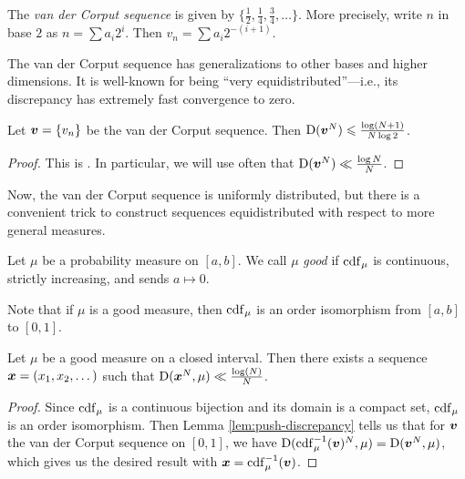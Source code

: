 \begin{definition}
The \emph{van der Corput sequence} is given by 
$\{\frac 1 2,\frac 1 4,\frac 3 4,\dots\}$. More precisely, write $n$ in base 
$2$ as $n = \sum a_i 2^i$. Then $v_n = \sum a_i 2^{-(i+1)}$. 
\end{definition}

The van der Corput sequence has generalizations to other bases and higher 
dimensions. It is well-known for being ``very equidistributed''---i.e., its 
discrepancy has extremely fast convergence to zero. 

\begin{lemma}
Let ${\boldsymbol v}=\{v_n\}$ be the van der Corput sequence. Then
$\operatorname{D}({\boldsymbol v}^N) \leqslant \frac{\log(N+1)}{N\log 2}$. 
\end{lemma}
\begin{proof}
This is \cite[Ch.~2 Th.~3.5]{kuipers-niederreiter-1974}. In particular, we 
will use often that $\operatorname{D}({\boldsymbol v}^N)\ll \frac{\log N}{N}$. 
\end{proof}

Now, the van der Corput sequence is uniformly distributed, but there is a 
convenient trick to construct sequences equidistributed with respect to more 
general measures. 

\begin{definition}
Let $\mu$ be a probability measure on $[a,b]$. We call $\mu$ \emph{good} if 
$\operatorname{cdf}_\mu$ is continuous, strictly increasing, and sends $a\mapsto 0$. 
\end{definition}

Note that if $\mu$ is a good measure, then $\operatorname{cdf}_\mu$ is an order isomorphism 
from $[a,b]$ to $[0,1]$. 

\begin{theorem}\label{thm:van-der-corput}
Let $\mu$ be a good measure on a closed interval. Then there exists a sequence 
${\boldsymbol x}=(x_1,x_2,\dots)$ such that $\operatorname{D}({\boldsymbol x}^N,\mu) \ll \frac{\log(N)}{N}$. 
\end{theorem}
\begin{proof}
Since $\operatorname{cdf}_\mu$ is a continuous bijection and its domain is a compact set, 
$\operatorname{cdf}_\mu$ is an order isomorphism. Then Lemma \ref{lem:push-discrepancy} tells 
us that for ${\boldsymbol v}$ the van der Corput sequence on $[0,1]$, we have 
$\operatorname{D}(\operatorname{cdf}_\mu^{-1}({\boldsymbol v})^N, \mu) = \operatorname{D}({\boldsymbol v}^N,\mu)$, which gives us the 
desired result with ${\boldsymbol x} = \operatorname{cdf}_\mu^{-1}({\boldsymbol v})$. 
\end{proof}

